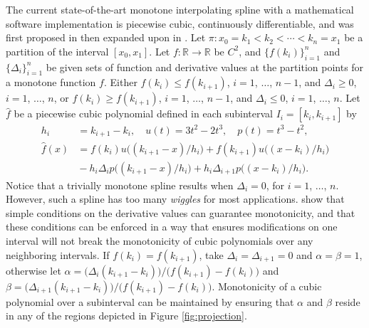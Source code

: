 \documentclass{scspaperproc}
\theoremstyle{scsthe}
\begin{document}
The current state-of-the-art monotone interpolating spline with a mathematical software implementation is piecewise cubic, continuously differentiable, and was first proposed in \cite{fritsch1980monotone} then expanded upon in \cite{carlson1985monotone}. Let $\pi: x_0 = k_1 < k_2 < \cdots < k_n = x_1$ be a partition of the interval $[x_0,x_1]$. Let $f: \mathbb{R} \rightarrow \mathbb{R}$ be $C^2$, and $\bigl\{f(k_i)\bigr\}_{i=1}^n$ and $\bigl\{\Delta_i\bigr\}_{i=1}^n$ be given sets of function and derivative values at the partition points for a monotone function $f$. Either $f(k_i) \leq f(k_{i+1})$, $i=1$, $\ldots$, $n-1$, and $\Delta_i\ge0$, $i=1$, $\ldots$, $n$, or $f(k_i) \geq f(k_{i+1})$, $i=1$, $\ldots$, $n-1$, and $\Delta_i\le0$, $i=1$, $\ldots$, $n$. Let $\hat f$ be a piecewise cubic polynomial defined in each subinterval $I_i = [k_i, k_{i+1}]$ by
\begin{equation}\begin{aligned}
h_i &= k_{i+1} - k_{i}, \quad
u(t) = 3t^2 - 2t^3, \quad
p(t) = t^3 - t^2,\\
\hat f(x) &= f(k_i) u\big((k_{i+1} - x) / h_i\big) +
f(k_{i+1}) u\big((x - k_i) / h_i\big) \\
&{} - h_i\Delta_i p\big((k_{i+1}-x)/h_i\big) + h_i\Delta_{i+1}
p\big((x-k_i)/h_i\big).
\end{aligned}\end{equation}
Notice that a trivially monotone spline results when $\Delta_i = 0$, for $i = 1$, $\ldots$, $n$. However, such a spline has too many \textit{wiggles} for most applications.  show that simple conditions on the derivative values can guarantee monotonicity, and that these conditions can be enforced in a way that ensures modifications on one interval will not break the monotonicity of cubic polynomials over any neighboring intervals. If $f(k_i) = f(k_{i+1})$, take $\Delta_i = \Delta_{i+1} =0$ and $\alpha =\beta =1$, otherwise let $\alpha = \big(\Delta_i (k_{i+1}-k_i)\big) / \big(f(k_{i+1}) - f(k_i)\big)$ and $\beta = \big(\Delta_{i+1}(k_{i+1}-k_i)\big) / \big(f(k_{i+1}) - f(k_i)\big)$. Monotonicity of a cubic polynomial over a subinterval can be maintained by ensuring that $\alpha$ and $\beta$ reside in any of the regions depicted in Figure \ref{fig:projection}.
\end{document}
